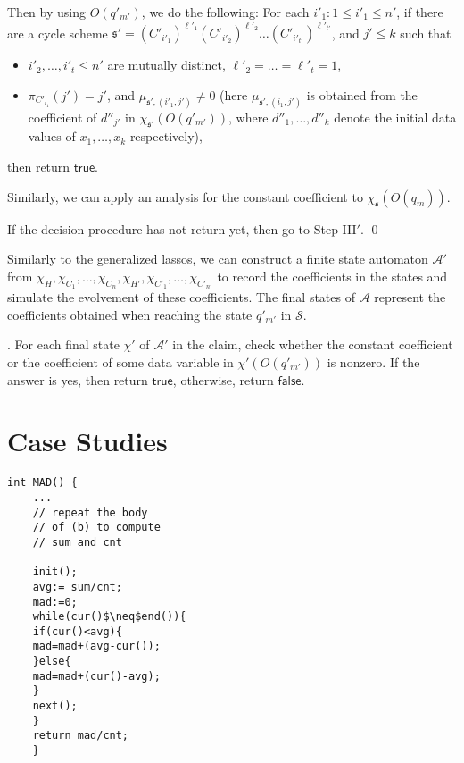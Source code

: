\documentclass[runningheads,a4paper]{llncs}
\def\Aa{{\mathcal{A} }}
\def\Ss{{\mathcal{S} }}
\def\schm{{\mathfrak{s} }}
\newcommand\ltrue{\mathsf{true}}
\newcommand\lfalse{\mathsf{false}}
\begin{document}
Then by using $O(q'_{m'})$, we do the following: For each $i'_1: 1 \le i'_1 \le n'$, if there are a cycle scheme $\schm' =(C'_{i'_1})^{\ell'_1} (C'_{i'_2})^{\ell'_2} \dots (C'_{i'_{t'}})^{\ell'_{t'}}$, and $j' \le k$ such that
\begin{itemize}
\item $i'_2,\dots,i'_t \le n'$ are mutually distinct, $\ell'_2 = \dots = \ell'_t = 1$, 
%
\item $\pi_{C'_{i_1}}(j')=j'$, and $\mu_{\schm',(i'_1,j')} \neq 0$ (here $\mu_{\schm',(i_1,j')}$ is obtained from the coefficient of $d''_{j'}$ in  $\chi_{\schm'}(O(q'_{m'}))$, where $d''_1,\dots,d''_k$ denote the initial data values of $x_1,\dots,x_k$ respectively),
\end{itemize}
then return $\ltrue$. 

Similarly, we can apply an analysis for the constant coefficient to $\chi_\schm(O(q_m))$. 

If the decision procedure has not return yet, then go to Step III$'$. \qed

\smallskip

Similarly to the generalized lassos, we can construct a finite state automaton $\Aa'$ from $\chi_H,\chi_{C_1},\dots,\chi_{C_n},\chi_{H'}, \chi_{C'_1},\dots,\chi_{C'_{n'}}$ to record the coefficients in the states and simulate the evolvement of these coefficients. The final states of $\Aa$ represent the coefficients obtained when reaching the state $q'_{m'}$ in $\Ss$. 

\smallskip 

. For each final state $\chi'$ of $\Aa'$ in the claim, check whether the constant coefficient or the coefficient of some data variable in $\chi'(O(q'_{m'}))$ is nonzero. If the answer is yes, then return $\ltrue$, otherwise, return $\lfalse$.





\section{Case Studies}

	\begin{lstlisting}[mathescape=true]
	int MAD() {
	...
	// repeat the body  
	// of (b) to compute
	// sum and cnt
	
	init();
	avg:= sum/cnt;
	mad:=0;
	while(cur()$\neq$end()){
	if(cur()<avg){
	mad=mad+(avg-cur());
	}else{
	mad=mad+(cur()-avg);
	}
	next();
	}
	return mad/cnt;
	}
	\end{lstlisting}
	
\end{document}
